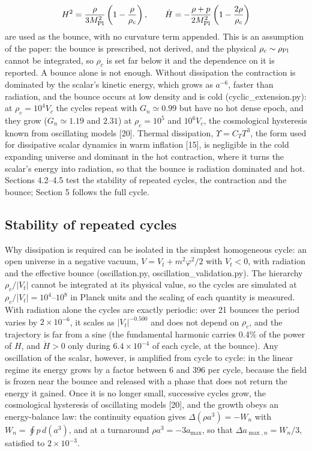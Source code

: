 \documentclass[pdflatex,sn-mathphys-num]{sn-jnl}
\begin{document}
\begin{equation}
H^2=\frac{\rho}{3M_{\rm Pl}^2}\left(1-\frac{\rho}{\rho_c}\right),\qquad \dot H=-\frac{\rho+p}{2M_{\rm Pl}^2}\left(1-\frac{2\rho}{\rho_c}\right)
\end{equation}
are used as the bounce, with no curvature term appended. This is an assumption of the paper: the bounce is prescribed, not derived, and the physical $\rho_c\sim\rho_{\rm Pl}$ cannot be integrated, so $\rho_c$ is set far below it and the dependence on it is reported. A bounce alone is not enough. Without dissipation the contraction is dominated by the scalar's kinetic energy, which grows as $a^{-6}$, faster than radiation, and the bounce occurs at low density and is cold (cyclic\_extension.py): at $\rho_c=10^4V_c$ the cycles repeat with $G_n\simeq0.99$ but have no hot dense epoch, and they grow ($G_n\simeq1.19$ and $2.31$) at $\rho_c=10^5$ and $10^6V_c$, the cosmological hysteresis known from oscillating models [20]. Thermal dissipation, $\Upsilon=C_TT^3$, the form used for dissipative scalar dynamics in warm inflation [15], is negligible in the cold expanding universe and dominant in the hot contraction, where it turns the scalar's energy into radiation, so that the bounce is radiation dominated and hot. Sections 4.2--4.5 test the stability of repeated cycles, the contraction and the bounce; Section 5 follows the full cycle.

\subsection{Stability of repeated cycles}
Why dissipation is required can be isolated in the simplest homogeneous cycle: an open universe in a negative vacuum, $V=V_t+m^2\varphi^2/2$ with $V_t<0$, with radiation and the effective bounce (oscillation.py, oscillation\_validation.py). The hierarchy $\rho_c/|V_t|$ cannot be integrated at its physical value, so the cycles are simulated at $\rho_c/|V_t|=10^4$--$10^8$ in Planck units and the scaling of each quantity is measured. With radiation alone the cycles are exactly periodic: over 21 bounces the period varies by $2\times10^{-6}$, it scales as $|V_t|^{-0.500}$ and does not depend on $\rho_c$, and the trajectory is far from a sine (the fundamental harmonic carries 0.4\% of the power of $H$, and $\dot H>0$ only during $6.4\times10^{-4}$ of each cycle, at the bounce). Any oscillation of the scalar, however, is amplified from cycle to cycle: in the linear regime its energy grows by a factor between 6 and 396 per cycle, because the field is frozen near the bounce and released with a phase that does not return the energy it gained. Once it is no longer small, successive cycles grow, the cosmological hysteresis of oscillating models [20], and the growth obeys an energy-balance law: the continuity equation gives $\Delta(\rho a^3)=-W_n$ with $W_n=\oint p\,d(a^3)$, and at a turnaround $\rho a^3=-3a_{\max}$, so that $\Delta a_{\max,n}=W_n/3$, satisfied to $2\times10^{-3}$.
\end{document}

